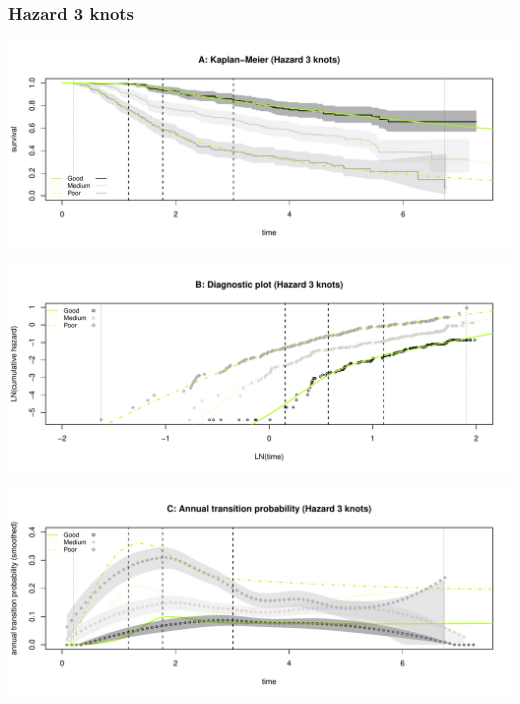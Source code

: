 \documentclass[
]{article}
\begin{document}
\clearpage

\subsubsection{Hazard 3 knots}\label{hazard-3-knots}

\begin{flushleft}\includegraphics[height=0.25\textheight]{BC_OS_output/Images/Figure_spline_models-7} \end{flushleft}

\begin{flushleft}\includegraphics[height=0.25\textheight]{BC_OS_output/Images/Figure_spline_models-8} \end{flushleft}

\begin{flushleft}\includegraphics[height=0.25\textheight]{BC_OS_output/Images/Figure_spline_models-9} \end{flushleft}
\end{document}
